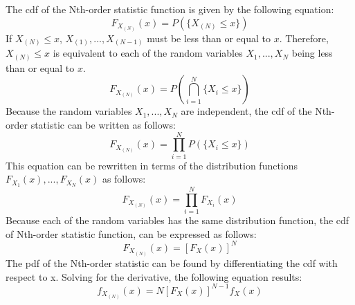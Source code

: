 \documentclass[conference]{IEEEtran}
\begin{document}
The cdf of the Nth-order statistic function is given by the following equation:
\begin{equation}
F_{X_{(N)}}(x) = P(\{X_{(N)} \leq x\})
\end{equation}
If $X_{(N)} \leq x$, $X_{(1)},...,X_{(N-1)}$ must be less than or equal to $x$. Therefore, $X_{(N)} \leq x$ is equivalent to each of the random variables $X_1,...,X_N$ being less than or equal to $x$.
\begin{equation}
F_{X_{(N)}}(x) = P\left(\bigcap_{i=1}^N\{X_i \leq x\}\right)
\end{equation}
Because the random variables $X_1,...,X_N$ are independent, the cdf of the Nth-order statistic can be written as follows:
\begin{equation}
F_{X_{(N)}}(x) = \prod_{i=1}^N P(\{X_i \leq x\})
\end{equation}
This equation can be rewritten in terms of the distribution functions $F_{X_1}(x),...,F_{X_N}(x)$ as follows:
\begin{equation}
F_{X_{(N)}}(x) = \prod_{i=1}^N F_{X_i}(x)
\end{equation}
Because each of the random variables has the same distribution function, the cdf of Nth-order statistic function, can be expressed as follows:
\begin{equation}
F_{X_{(N)}}(x) = [F_X(x)]^N
\end{equation}
The pdf of the Nth-order statistic can be found by differentiating the cdf with respect to x. Solving for the derivative, the following equation results:
\begin{equation}
f_{X_{(N)}}(x) = N[F_X(x)]^{N-1}f_X(x)
\end{equation}
\end{document}
